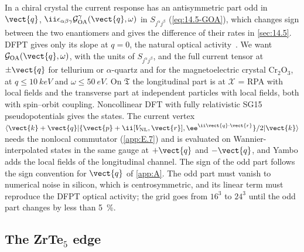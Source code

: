 In a chiral crystal the current response has an antisymmetric part odd in $\vect{q}$, $\ii\epsilon_{\alpha\beta\gamma}\mathcal{G}^\gamma_{\mathrm{OA}}(\vect{q},\omega)$ in $S_{j^\alpha j^\beta}$ (\cref{eq:14.5-GOA}), which changes sign between the two enantiomers and gives the difference of their rates in \cref{sec:14.5}. DFPT gives only its slope at $q = 0$, the natural optical activity~\cite{zabalo2023natural}. We want $\mathcal{G}_{\mathrm{OA}}(\vect{q},\omega)$, with the units of $S_{j^\alpha j^\beta}$, and the full current tensor at $\pm\vect{q}$ for tellurium or $\alpha$-quartz and for the magnetoelectric crystal Cr$_2$O$_3$, at $q \le \SI{10}{keV}$ and $\omega \le \SI{50}{eV}$. On $\mathfrak{T}$ the longitudinal part is at $\mathcal{X}$ = RPA with local fields and the transverse part at independent particles with local fields, both with spin--orbit coupling. Noncollinear DFT with fully relativistic SG15 pseudopotentials gives the states. The current vertex $\langle\vect{k}+\vect{q}|\{\vect{p} + \ii[V_{\mathrm{NL}},\vect{r}],\ee^{\ii\vect{q}\cdot\vect{r}}\}/2|\vect{k}\rangle$ needs the nonlocal commutator (\cref{app:E.7}) and is evaluated on Wannier-interpolated states in the same gauge at $+\vect{q}$ and $-\vect{q}$, and Yambo adds the local fields of the longitudinal channel. The sign of the odd part follows the sign convention for $\vect{q}$ of \cref{app:A}. The odd part must vanish to numerical noise in silicon, which is centrosymmetric, and its linear term must reproduce the DFPT optical activity; the grid goes from $16^3$ to $24^3$ until the odd part changes by less than \SI{5}{\percent}.

\subsection{The ZrTe\texorpdfstring{$_5$}{5} edge}

